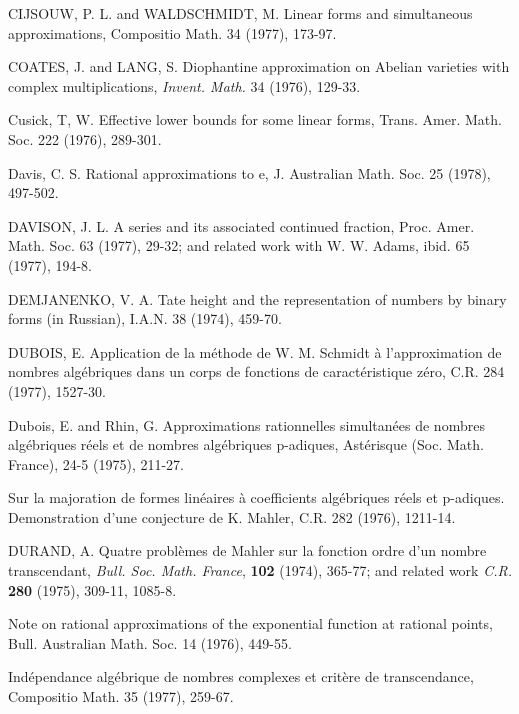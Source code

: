 \begin{hanglist}
    \item CIJSOUW, P. L. and WALDSCHMIDT, M. Linear forms and simultaneous approximations, Compositio Math. 34 (1977), 173-97.
    \item COATES, J. and LANG, S. Diophantine approximation on Abelian varieties with complex multiplications, \textit{Invent. Math.} 34 (1976), 129-33.
    \item Cusick, T, W. Effective lower bounds for some linear forms, Trans. Amer. Math. Soc. 222 (1976), 289-301.
    \item Davis, C. S. Rational approximations to e, J. Australian Math. Soc. 25 (1978), 497-502.
    \item DAVISON, J. L. A series and its associated continued fraction, Proc. Amer. Math. Soc. 63 (1977), 29-32; and related work with W. W. Adams, ibid. 65 (1977), 194-8.
    \item DEMJANENKO, V. A. Tate height and the representation of numbers by binary forms (in Russian), I.A.N. 38 (1974), 459-70.
    \item DUBOIS, E. Application de la méthode de W. M. Schmidt à l'approximation de nombres algébriques dans un corps de fonctions de caractéristique zéro, C.R. 284 (1977), 1527-30.
    \item Dubois, E. and Rhin, G. Approximations rationnelles simultanées de nombres algébriques réels et de nombres algébriques p-adiques, Astérisque (Soc. Math. France), 24-5 (1975), 211-27.
    \item \hspace{1.5em} Sur la majoration de formes linéaires à coefficients algébriques réels et p-adiques. Demonstration d'une conjecture de K. Mahler, C.R. 282 (1976), 1211-14.
    \item DURAND, A. Quatre problèmes de Mahler sur la fonction ordre d'un nombre transcendant, \textit{Bull. Soc. Math. France}, \textbf{102} (1974), 365-77; and related work \textit{C.R.} \textbf{280} (1975), 309-11, 1085-8.
    \item \hspace{1.5em} Note on rational approximations of the exponential function at rational points, Bull. Australian Math. Soc. 14 (1976), 449-55.
    \item \hspace{1.5em} Indépendance algébrique de nombres complexes et critère de transcendance, Compositio Math. 35 (1977), 259-67.

\end{hanglist}
